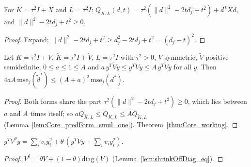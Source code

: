 \begin{lemma}[Prediction variance for $K = \tau^2I + X$]\label{lem:Core_predForm_smul_one}
  \leanok
  For $K = \tau^2I + X$ and $L = \tau^2I$:
  $Q_{K,L}(d,t) = \tau^2(\lVert d\rVert^2 - 2td_j + t^2) + d^TXd$, and
  $\lVert d\rVert^2 - 2td_j + t^2 \ge 0$.
\end{lemma}
\begin{proof}
  \leanok
  Expand; $\lVert d\rVert^2 - 2td_j + t^2 \ge d_j^2 - 2td_j + t^2 = (d_j - t)^2$.
\end{proof}

\begin{theorem}\label{thm:Core_noiseWorking}
  \leanok
  Let $K = \tau^2I + V$, $\tilde K = \tau^2I + \tilde V$, $L = \tau^2I$ with $\tau^2 > 0$,
  $V$ symmetric, $\tilde V$ positive semidefinite, $0 \le a \le 1 \le A$ and
  $a\,y^T\tilde Vy \le y^TVy \le A\,y^T\tilde Vy$ for all $y$. Then
  $4aA\,\mathrm{mse}_j(\tilde d^*) \le (A+a)^2\,\mathrm{mse}_j(d^*)$.
\end{theorem}
\begin{proof}
  \leanok
  Both forms share the part $\tau^2(\lVert d\rVert^2 - 2td_j + t^2) \ge 0$, which lies
  between $a$ and $A$ times itself; so $aQ_{\tilde K,L} \le Q_{K,L} \le AQ_{\tilde K,L}$
  (Lemma~\ref{lem:Core_predForm_smul_one}). Theorem~\ref{thm:Core_working}.
\end{proof}

\begin{lemma}\label{lem:Core_shrinkOffDiag_form}
  \leanok
  $y^TV^\theta y = \sum_i v_iy_i^2 + \theta\,(y^TVy - \sum_i v_iy_i^2)$.
\end{lemma}
\begin{proof}
  \leanok
  $V^\theta = \theta V + (1-\theta)\mathrm{diag}(V)$ (Lemma~\ref{lem:shrinkOffDiag_eq}).
\end{proof}

